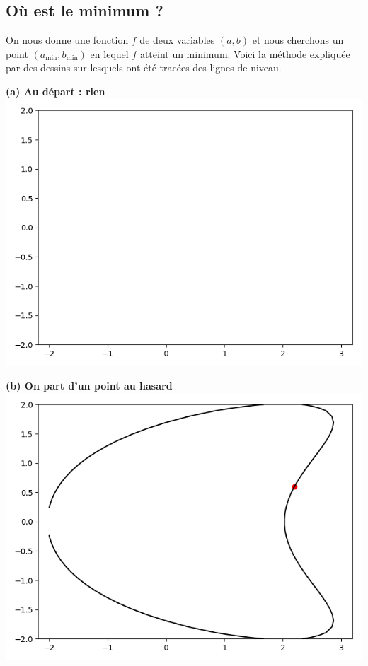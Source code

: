 \documentclass[11pt,class=report,crop=false]{standalone}
\begin{document}
\subsection{Où est le minimum ?}

On nous donne une fonction $f$ de deux variables $(a,b)$ et nous cherchons un point
$(a_{\min},b_{\min})$ en lequel $f$ atteint un minimum.
Voici la méthode expliquée par des dessins sur lesquels ont été tracées des lignes de niveau.

\begin{center}
\begin{minipage}{0.48\textwidth}
\begin{center}
{\bf (a) Au départ : rien}
\includegraphics[scale=\myscale,scale=0.5]{figures/descente_intro_01}
\end{center}
\end{minipage}
\begin{minipage}{0.48\textwidth}
\begin{center}
{\bf (b) On part d'un point au hasard}
\includegraphics[scale=\myscale,scale=0.5]{figures/descente_intro_02}
\end{center}
\end{minipage}
\end{center}
\end{document}
